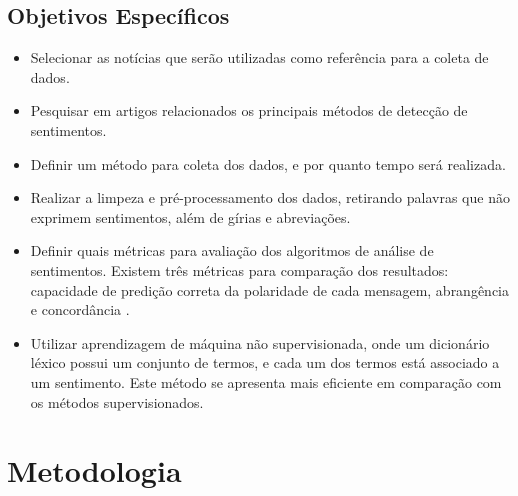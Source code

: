 \documentclass[12pt,article,a4paper,brazil,oldfontcommands,oneside]{abntex2}
\begin{document}
\subsection{Objetivos Específicos}

\begin{itemize}
    \item Selecionar as notícias que serão utilizadas como referência para a coleta de dados.
    \item Pesquisar em artigos relacionados os principais métodos de detecção de sentimentos.
    \item Definir um método para coleta dos dados, e por quanto tempo será realizada.
    \item Realizar a limpeza e pré-processamento dos dados, retirando palavras que não exprimem sentimentos, além de gírias e abreviações.
    \item Definir quais métricas para avaliação dos algoritmos de análise de sentimentos. Existem três métricas para comparação dos resultados: capacidade de predição correta da polaridade de cada mensagem, abrangência e concordância \cite{araujometodos}.
    \item Utilizar aprendizagem de máquina não supervisionada, onde um dicionário léxico possui um conjunto de termos, e cada um dos termos está associado a um sentimento. Este método se apresenta mais eficiente em comparação com os métodos supervisionados. \cite{benevenuto2015metodos}
\end{itemize}

\section{Metodologia}
\end{document}
